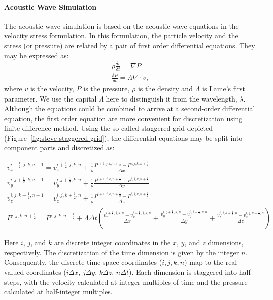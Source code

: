 \paragraph{Acoustic Wave Simulation}
The acoustic wave simulation is based on the acoustic wave equations in the
velocity stress formulation. In this formulation, the particle velocity and the
stress (or pressure) are related by a pair of first order differential
equations. They may be expressed as:
\begin{align*}
\rho \frac{\delta v}{\delta t} = \nabla P\\
\frac{\delta P}{\delta t} = \Lambda \nabla \cdot v,
\end{align*}
where $v$ is the velocity, $P$ is the pressure, $\rho$ is the density and
$\Lambda$ is Lame's first parameter.  We use the capital $\Lambda$ here to
distinguish it from the wavelength, $\lambda$. Although the equations could be
combined to arrive at a second-order differential equation, the first order
equation are more convenient for discretization using finite difference method.
Using the so-called staggered grid depicted (Figure~\ref{fig:steve-staggered-grid}), the differential
equations may be split into component parts and discretized as:

\begin{gather*}
    v_x^{i+\frac{1}{2},j,k,n+1} = v_x^{i+\frac{1}{2},j,k,n} + 
                                  \frac{1}{\rho}\frac{P^{i+1,j,k,n+\frac{1}{2}}-P^{i,j,k,n+\frac{1}{2}}}{\Delta x}\\
    v_y^{i,j+\frac{1}{2},k,n+1} = v_y^{i,j+\frac{1}{2},k,n} + 
                                  \frac{1}{\rho}\frac{P^{i+1,j,k,n+\frac{1}{2}}-P^{i,j,k,n+\frac{1}{2}}}{\Delta y}\\
    v_z^{i,j,k+\frac{1}{2},n+1} = v_z^{i,j,k+\frac{1}{2},n} + 
                                  \frac{1}{\rho}\frac{P^{i+1,j,k,n+\frac{1}{2}}-P^{i,j,k,n+\frac{1}{2}}}{\Delta z}\\
    P^{i,j,k,n+\frac{1}{2}} = P^{i,j,k,n-\frac{1}{2}} + \Lambda \Delta t 
                              \left( 
                                    \frac{v_x^{i+\frac{1}{2},j,k,n}  - v_x^{i-\frac{1}{2},j,k,n}}{\Delta x} +
                                    \frac{v_y^{i,j+\frac{1}{2},k,n}  - v_y^{i,j-\frac{1}{2},k,n}}{\Delta y} +
                                    \frac{v_z^{i,j,k+\frac{1}{2},n}  - v_z^{i,j,k-\frac{1}{2},n}}{\Delta z}
                              \right)
\end{gather*}

Here $i$, $j$, and $k$ are discrete integer coordinates in the $x$, $y$, and
$z$ dimensions, respectively. The discretization of the time dimension is given
by the integer $n$. Consequently, the discrete time-space coordinates ($i, j,
k, n$) map to the real valued coordinates ($i \Delta x$, $j \Delta y$, $k\Delta
z$, $n \Delta t$). Each dimension is staggered into half steps, with the
velocity calculated at integer multiples of time and the pressure calculated at
half-integer multiples. 

